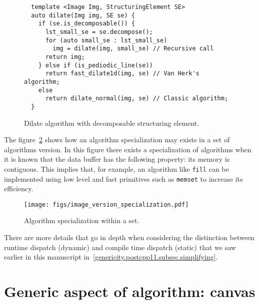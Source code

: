 \begin{figure}[tbh]
  \centering
  \begin{verbatim}
  template <Image Img, StructuringElement SE>
  auto dilate(Img img, SE se) {
    if (se.is_decomposable()) {
      lst_small_se = se.decompose();
      for (auto small_se : lst_small_se)
        img = dilate(img, small_se) // Recursive call
      return img;
    } else if (is_pediodic_line(se))
      return fast_dilate1d(img, se) // Van Herk's algorithm;
    else
      return dilate_normal(img, se) // Classic algorithm;
  }
  \end{verbatim}

  \caption{Dilate algorithm with decomposable structuring element.}
  \label{fig.decomp.dilate}
\end{figure}

The figure~\ref{fig.image.specialization} shows how an algorithm specialization may exists in a set of algorithms
version. In this figure there exists a specialization of algorithms when it is known that the data buffer has the
following property: its memory is contiguous. This implies that, for example, an algorithm like \texttt{fill} can be
implemented using low level and fast primitives such as \texttt{memset} to increase its efficiency.

\begin{figure}[tbh]
  \centering
  \texttt{[image: figs/image\_version\_specialization.pdf]}
  \caption{Algorithm specialization within a set.}
  \label{fig.image.specialization}
\end{figure}

There are more details that go in depth when considering the distinction between runtime dispatch (dynamic) and
compile time dispatch (static) that we saw earlier in this manuscript in~\cref{genericity.postcpp11.subsec.simplifying}.


\section{Generic aspect of algorithm: canvas}
\label{image_and_algorithms_taxonomy.sec.canvas}

